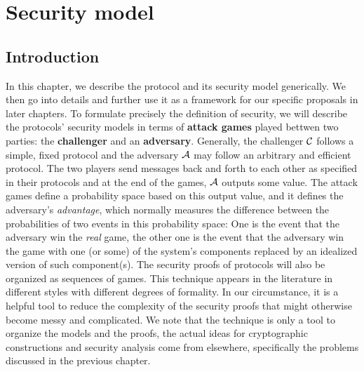 
\chapter{Security model}
\ifpdf
    \graphicspath{{Chapter3/Figs/Raster/}{Chapter3/Figs/PDF/}{Chapter3/Figs/}}
\else
    \graphicspath{{Chapter3/Figs/Vector/}{Chapter3/Figs/}}
\fi

\section{Introduction}
\label{sec:syntaxModel}
In this chapter, we describe the protocol and its security model generically.
We then go into details and further use it as a framework for our specific
proposals in later chapters. To formulate precisely the definition of security,
we will describe the protocols' security models in terms of \textbf{attack
  games} played bettwen two parties: the \textbf{challenger} and an
\textbf{adversary}. Generally, the challenger \(\mathcal{C}\) follows a simple,
fixed protocol and the adversary \(\mathcal{A}\) may follow an arbitrary and
efficient protocol. The two players send messages back and forth to each other
as specified in their protocols and at the end of the games, \(\mathcal{A}\)
outputs some value. The attack games define a probability space based on this
output value, and it defines the adversary's \textit{advantage}, which normally
measures the difference between the probabilities of two events in this
probability space: One is the event that the adversary win the \textit{real}
game, the other one is the event that the adversary win the game with one (or
some) of the system's components replaced by an idealized version of such
component(s). The security proofs of protocols will also be organized as
sequences of games. This technique appears in the literature in different styles
with different degrees of formality. In our circumstance, it is a helpful tool
to reduce the complexity of the security proofs that might otherwise become
messy and complicated. We note that the technique is only a tool to organize the
models and the proofs, the actual ideas for cryptographic constructions and
security analysis come from elsewhere, specifically the problems discussed in
the previous chapter.

